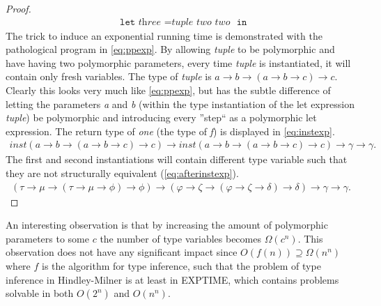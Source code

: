 \begin{proof}
\begin{align}
      &\texttt{let } \textit{three } = \textit{tuple } \textit{two } \textit{two } \texttt{ in } \tag*{}
    \end{align}
    The trick to induce an exponential running time is demonstrated with the pathological program in \autoref{eq:ppexp}.
    By allowing \textit{tuple} to be polymorphic and have having two polymorphic parameters, every time \textit{tuple} is instantiated, it will contain only fresh variables.
    The type of \textit{tuple} is $a \rightarrow b \rightarrow (a \rightarrow b \rightarrow c) \rightarrow c$.
    Clearly this looks very much like \autoref{eq:ppexp}, but has the subtle difference of letting the parameters \textit{a} and \textit{b} (within the type instantiation of the let expression \textit{tuple}) be polymorphic and introducing every ''step`` as a polymorphic let expression.
    The return type of \textit{one} (the type of \textit{f}) is displayed in \autoref{eq:instexp}.
    \begin{align}
        \textit{inst}(a \rightarrow b \rightarrow (a \rightarrow b \rightarrow c) \rightarrow c) \rightarrow \textit{inst}(a \rightarrow b \rightarrow (a \rightarrow b \rightarrow c) \rightarrow c) \rightarrow \gamma \rightarrow \gamma.
        \label{eq:instexp}
    \end{align}
    The first and second instantiations will contain different type variable such that they are not structurally equivalent (\autoref{eq:afterinstexp}).
    \begin{align}
        (\tau \rightarrow \mu \rightarrow (\tau \rightarrow \mu \rightarrow \phi) \rightarrow \phi) \rightarrow (\varphi \rightarrow \zeta \rightarrow (\varphi \rightarrow \zeta \rightarrow \delta) \rightarrow \delta) \rightarrow \gamma \rightarrow \gamma.
        \label{eq:afterinstexp}
    \end{align}
\end{proof}
An interesting observation is that by increasing the amount of polymorphic parameters to some $c$ the number of type variables becomes $\Omega(c^n)$.
This observation does not have any significant impact since $O(f(n)) \supseteq \Omega(n^n)$ where $f$ is the algorithm for type inference, such that the problem of type inference in Hindley-Milner is at least in EXPTIME, which contains problems solvable in both $O(2^n)$ and $O(n^n)$.
